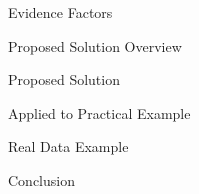 \documentclass{beamer}
\begin{document}
\begin{frame}{Evidence Factors}

\end{frame}

\begin{frame}{Proposed Solution Overview}
\end{frame}

\begin{frame}{Proposed Solution}
\end{frame}

\begin{frame}{Applied to Practical Example}
\end{frame}

\begin{frame}{Real Data Example}
\end{frame}

\begin{frame}{Conclusion}
\end{frame}
\end{document}
